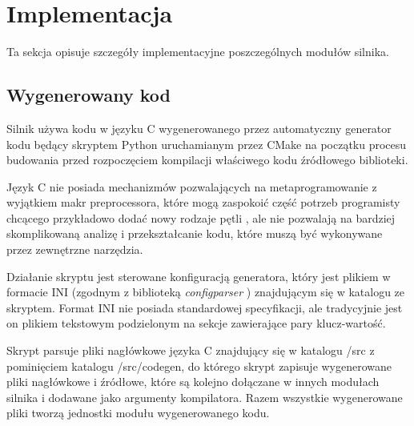 \section {Implementacja}

Ta sekcja opisuje szczegóły implementacyjne poszczególnych modułów silnika.

\subsection{Wygenerowany kod}

Silnik używa kodu w języku C wygenerowanego przez automatyczny generator kodu będący skryptem Python uruchamianym przez CMake na początku procesu budowania przed rozpoczęciem kompilacji właściwego
kodu źródłowego biblioteki.

Język C nie posiada mechanizmów pozwalających na metaprogramowanie z wyjątkiem makr preprocessora, które mogą zaspokoić część potrzeb programisty chcącego przykładowo dodać nowy rodzaje pętli \cite{METACONTROLC}, ale nie pozwalają na bardziej skomplikowaną analizę i przekształcanie kodu, które muszą być wykonywane przez zewnętrzne narzędzia.

Działanie skryptu jest sterowane konfiguracją generatora, który jest plikiem w formacie INI (zgodnym z biblioteką \textit{configparser} \cite{PYTHONCONFIGPARSER}) znajdującym się w katalogu ze skryptem.
Format INI nie posiada standardowej specyfikacji, ale tradycyjnie jest on plikiem tekstowym podzielonym na sekcje zawierające pary klucz-wartość.

Skrypt parsuje pliki nagłówkowe języka C znajdujący się w katalogu /src z
pominięciem katalogu /src/codegen, do którego skrypt zapisuje wygenerowane pliki nagłówkowe i źródłowe, które są kolejno dołączane w innych modułach silnika i dodawane jako argumenty kompilatora.
Razem wszystkie wygenerowane pliki tworzą jednostki modułu wygenerowanego kodu.


